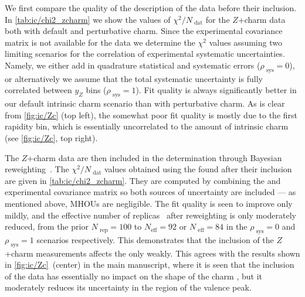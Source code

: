 We first compare the quality of the description of the \lhcb data
before their inclusion. In \cref{tab:ic/chi2_zcharm} we show the
values of $\chi^2/N_\textrm{ dat}$ for the \lhcb $Z$+charm data
both with default and perturbative charm.
%
Since the experimental covariance matrix is not available for the \lhcb
data we determine the $\chi^2$ values assuming two limiting scenarios
for the correlation of experimental systematic uncertainties.
%
Namely, 
we either add in quadrature statistical and systematic errors ($\rho_\textrm{ sys}=0$),
or alternatively we assume that the total systematic uncertainty
is fully correlated between $y_Z$ bins ($\rho_\textrm{ sys}=1$). Fit
quality is always significantly better in our default intrinsic charm
scenario than with perturbative charm.
%
As is clear from
\cref{fig:ic/Zc} (top left), the somewhat poor fit quality is mostly due to the first
rapidity bin, which is essentially uncorrelated to the amount of
intrinsic charm (see
\cref{fig:ic/Zc}, top right).

The \lhcb $Z$+charm data are then included in the \pdf determination
through
Bayesian reweighting~\cite{Ball:2010gb,Ball:2011gg}. The
$\chi^2/N_\textrm{ dat}$ values obtained using the \pdfs found after their
inclusion are given in
\cref{tab:ic/chi2_zcharm}.
%
They are computed by combining the \pdf and
experimental covariance matrix so both sources of uncertainty are
included --- as mentioned above, MHOUs are negligible.
The fit quality is seen to improve only
mildly, and the effective number of
replicas~\cite{Ball:2010gb,Ball:2011gg} after reweighting
is only moderately reduced, from the prior $N_\textrm{ rep}=100$ to $N_\textrm{
eff}=92$ or $N_\textrm{ eff}=84$ in the
$\rho_\textrm{ sys}=0$ and $\rho_\textrm{ sys}=1$ scenarios respectively.
%
This
demonstrates that the inclusion of the \lhcb $Z$+charm measurements  affects
the \pdfs only weakly. This agrees with the results shown in 
\cref{fig:ic/Zc}~(center) in
the main manuscript, where it is seen that the inclusion of the \lhcb
data has essentially no impact on the shape of the charm \pdf, but
it moderately reduces its uncertainty in the region of the valence peak.

